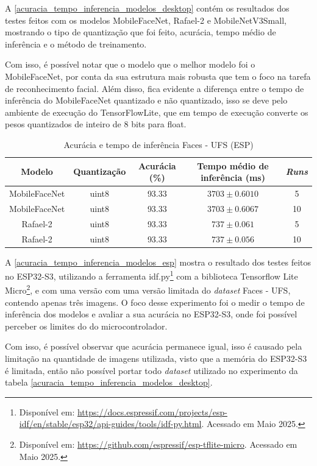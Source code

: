 A \autoref{acuracia_tempo_inferencia_modelos_desktop} contém os resultados dos testes feitos com os modelos
MobileFaceNet, Rafael-2 e MobileNetV3Small, mostrando o tipo de quantização que foi feito, acurácia, tempo
médio de inferência e o método de treinamento.

Com isso, é possível notar que o modelo que o melhor modelo foi o MobileFaceNet, por conta da sua estrutura
mais robusta que tem o foco na tarefa de reconhecimento facial. Além disso, fica evidente a diferença entre
o tempo de inferência do MobileFaceNet quantizado e não quantizado, isso se deve pelo ambiente de execução
do TensorFlowLite, que em tempo de execução converte os pesos quantizados de inteiro de 8 bits para float.

\begin{table}[htb]
\centering
\ABNTEXfontereduzida
\caption[Acurácia e tempo de inferência (ESP)]{Acurácia e tempo de inferência Faces - UFS (ESP)}
\label{acuracia_tempo_inferencia_modelos_esp}
\begin{tabular}{ |c|c|c|c|c| }
	\hline
	\textbf{Modelo} & \textbf{Quantização} & \textbf{Acurácia (\%)} & \textbf{Tempo médio de inferência (ms)} & \textbf{\textit{Runs}} \\
	\hline
	MobileFaceNet 	&uint8	& 	93.33& $3703 \pm 0.6010$ & 5 \\
	MobileFaceNet 	&uint8	& 	93.33& $3703 \pm 0.6067$ & 10 \\
	Rafael-2	&uint8	& 	93.33& $737 \pm 0.061$ & 5\\
	Rafael-2	&uint8	& 	93.33& $737 \pm 0.056$ & 10\\
	\hline
\end{tabular}
\end{table}

A \autoref{acuracia_tempo_inferencia_modelos_esp} mostra o resultado dos testes feitos no ESP32-S3,
utilizando a ferramenta idf.py\footnote{Disponível em:
\url{https://docs.espressif.com/projects/esp-idf/en/stable/esp32/api-guides/tools/idf-py.html}.
Acessado em Maio 2025.}
com a biblioteca Tensorflow Lite Micro\footnote{Disponível em: \url{
https://github.com/espressif/esp-tflite-micro}. Acessado em Maio 2025.},
e com uma versão com uma versão limitada do \textit{dataset} Faces - UFS, contendo apenas três imagens.
O foco desse experimento foi o medir o tempo de inferência dos modelos e avaliar a sua acurácia
no ESP32-S3, onde foi possível perceber os limites do do microcontrolador.

Com isso, é possível observar que acurácia permanece igual, isso é causado pela limitação na
quantidade de imagens utilizada, visto que a memória do ESP32-S3 é limitada, então não possível
portar todo \textit{dataset} utilizado no experimento da tabela
\autoref{acuracia_tempo_inferencia_modelos_desktop}.

